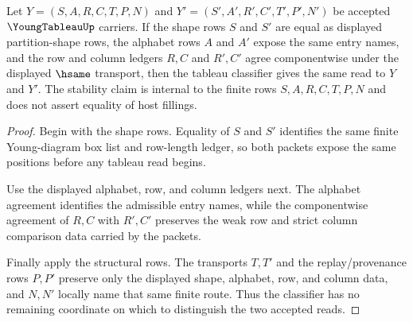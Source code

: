 \begin{theorem}
\label{thm:young-tableau-shape-row-column-stability}
Let $Y=(S,A,R,C,T,P,N)$ and $Y'=(S',A',R',C',T',P',N')$ be accepted $\YoungTableauUp$ carriers. If the shape rows $S$ and $S'$ are equal as displayed partition-shape rows, the alphabet rows $A$ and $A'$ expose the same entry names, and the row and column ledgers $R,C$ and $R',C'$ agree componentwise under the displayed $\hsame$ transport, then the tableau classifier gives the same read to $Y$ and $Y'$. The stability claim is internal to the finite rows $S,A,R,C,T,P,N$ and does not assert equality of host fillings.
\end{theorem}
\begin{proof}
Begin with the shape rows. Equality of $S$ and $S'$ identifies the same finite Young-diagram box list and row-length ledger, so both packets expose the same positions before any tableau read begins.

Use the displayed alphabet, row, and column ledgers next. The alphabet agreement identifies the admissible entry names, while the componentwise agreement of $R,C$ with $R',C'$ preserves the weak row and strict column comparison data carried by the packets.

Finally apply the structural rows. The transports $T,T'$ and the replay/provenance rows $P,P'$ preserve only the displayed shape, alphabet, row, and column data, and $N,N'$ locally name that same finite route. Thus the classifier has no remaining coordinate on which to distinguish the two accepted reads.
\end{proof}


\begin{closurestatus}{\YoungTableauUp}
  \theoryclosure{\seedClosure}
  \formalstatus{\unformalizedV}
\end{closurestatus}
